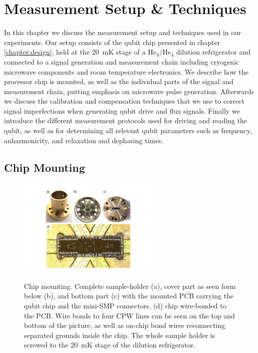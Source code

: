 \chapter{Measurement Setup \& Techniques} \label{chapter:measurement}

In this chapter we discuss the measurement setup and techniques used in our experiments. Our setup consists of the qubit chip presented in chapter \ref{chapter:design}, held at the 20~mK stage of a He$_3$/He$_4$ dilution refrigerator and connected to a signal generation and measurement chain including cryogenic microwave components and room temperature electronics. We describe how the processor chip is mounted, as well as the individual parts of the signal  and measurement chain, putting emphasis on microwave pulse generation. Afterwards we discuss the calibration and compensation techniques that we use to correct signal imperfections when generating qubit drive and flux signals. Finally we introduce the different measurement protocols used for driving and reading the qubit, as well as for determining all relevant qubit parameters such as frequency, anharmonicity, and relaxation and dephasing times.

\smallskip

\section{Chip Mounting}

\begin{figure}
	\centering
		\includegraphics[width=0.6\textwidth]{"./material/photos/sample holder/sample_holder"}
	\caption[]{Chip mounting. Complete sample-holder (a), cover part as seen form below (b), and bottom part (c) with the mounted PCB carrying the qubit chip and the mini-SMP connectors. (d)  chip  wire-bonded to the PCB. Wire bonds to four CPW lines can be seen on the top and bottom of the picture, as well as on-chip bond wires reconnecting separated grounds inside the chip. The whole sample holder is screwed to the 20~mK stage of the dilution refrigerator.}
	\label{fig:pcb_and_sample_holder}
\end{figure}


